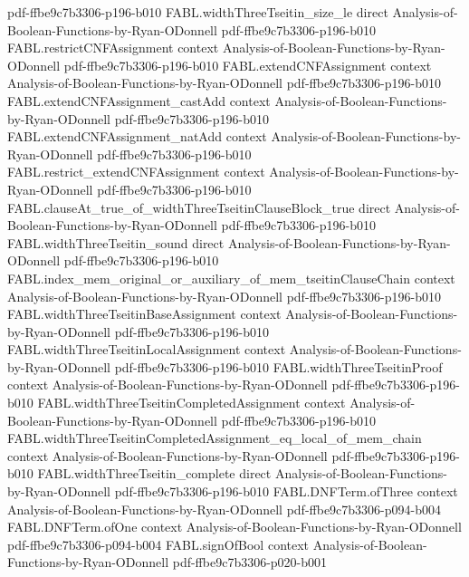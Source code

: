 \begin{theorem}
  {pdf-ffbe9c7b3306-p196-b010}
\proofstep
  {FABL.widthThreeTseitin_size_le}
  {direct}
  {Analysis-of-Boolean-Functions-by-Ryan-ODonnell}
  {pdf-ffbe9c7b3306-p196-b010}
\proofstep
  {FABL.restrictCNFAssignment}
  {context}
  {Analysis-of-Boolean-Functions-by-Ryan-ODonnell}
  {pdf-ffbe9c7b3306-p196-b010}
\proofstep
  {FABL.extendCNFAssignment}
  {context}
  {Analysis-of-Boolean-Functions-by-Ryan-ODonnell}
  {pdf-ffbe9c7b3306-p196-b010}
\proofstep
  {FABL.extendCNFAssignment_castAdd}
  {context}
  {Analysis-of-Boolean-Functions-by-Ryan-ODonnell}
  {pdf-ffbe9c7b3306-p196-b010}
\proofstep
  {FABL.extendCNFAssignment_natAdd}
  {context}
  {Analysis-of-Boolean-Functions-by-Ryan-ODonnell}
  {pdf-ffbe9c7b3306-p196-b010}
\proofstep
  {FABL.restrict_extendCNFAssignment}
  {context}
  {Analysis-of-Boolean-Functions-by-Ryan-ODonnell}
  {pdf-ffbe9c7b3306-p196-b010}
\proofstep
  {FABL.clauseAt_true_of_widthThreeTseitinClauseBlock_true}
  {direct}
  {Analysis-of-Boolean-Functions-by-Ryan-ODonnell}
  {pdf-ffbe9c7b3306-p196-b010}
\proofstep
  {FABL.widthThreeTseitin_sound}
  {direct}
  {Analysis-of-Boolean-Functions-by-Ryan-ODonnell}
  {pdf-ffbe9c7b3306-p196-b010}
\proofstep
  {FABL.index_mem_original_or_auxiliary_of_mem_tseitinClauseChain}
  {context}
  {Analysis-of-Boolean-Functions-by-Ryan-ODonnell}
  {pdf-ffbe9c7b3306-p196-b010}
\proofstep
  {FABL.widthThreeTseitinBaseAssignment}
  {context}
  {Analysis-of-Boolean-Functions-by-Ryan-ODonnell}
  {pdf-ffbe9c7b3306-p196-b010}
\proofstep
  {FABL.widthThreeTseitinLocalAssignment}
  {context}
  {Analysis-of-Boolean-Functions-by-Ryan-ODonnell}
  {pdf-ffbe9c7b3306-p196-b010}
\proofstep
  {FABL.widthThreeTseitinProof}
  {context}
  {Analysis-of-Boolean-Functions-by-Ryan-ODonnell}
  {pdf-ffbe9c7b3306-p196-b010}
\proofstep
  {FABL.widthThreeTseitinCompletedAssignment}
  {context}
  {Analysis-of-Boolean-Functions-by-Ryan-ODonnell}
  {pdf-ffbe9c7b3306-p196-b010}
\proofstep
  {FABL.widthThreeTseitinCompletedAssignment_eq_local_of_mem_chain}
  {context}
  {Analysis-of-Boolean-Functions-by-Ryan-ODonnell}
  {pdf-ffbe9c7b3306-p196-b010}
\proofstep
  {FABL.widthThreeTseitin_complete}
  {direct}
  {Analysis-of-Boolean-Functions-by-Ryan-ODonnell}
  {pdf-ffbe9c7b3306-p196-b010}
\proofstep
  {FABL.DNFTerm.ofThree}
  {context}
  {Analysis-of-Boolean-Functions-by-Ryan-ODonnell}
  {pdf-ffbe9c7b3306-p094-b004}
\proofstep
  {FABL.DNFTerm.ofOne}
  {context}
  {Analysis-of-Boolean-Functions-by-Ryan-ODonnell}
  {pdf-ffbe9c7b3306-p094-b004}
\proofstep
  {FABL.signOfBool}
  {context}
  {Analysis-of-Boolean-Functions-by-Ryan-ODonnell}
  {pdf-ffbe9c7b3306-p020-b001}

\end{theorem}
